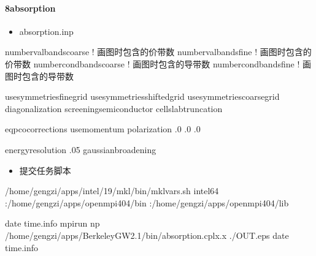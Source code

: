 \documentclass[a4paper,12pt,english]{sphinxmanual}
\begin{document}
\paragraph{8\sphinxhyphen{}absorption}
\label{\detokenize{tutorials/berkeleygw/gw:absorption}}\begin{itemize}
\item {} 
\sphinxAtStartPar
absorption.inp

\end{itemize}

\begin{sphinxVerbatim}[commandchars=\\\{\}]
number\PYGZus{}val\PYGZus{}bands\PYGZus{}coarse   ! 画图时包含的价带数
number\PYGZus{}val\PYGZus{}bands\PYGZus{}fine     ! 画图时包含的价带数
number\PYGZus{}cond\PYGZus{}bands\PYGZus{}coarse  ! 画图时包含的导带数
number\PYGZus{}cond\PYGZus{}bands\PYGZus{}fine    ! 画图时包含的导带数

use\PYGZus{}symmetries\PYGZus{}fine\PYGZus{}grid
use\PYGZus{}symmetries\PYGZus{}shifted\PYGZus{}grid
use\PYGZus{}symmetries\PYGZus{}coarse\PYGZus{}grid
diagonalization
screening\PYGZus{}semiconductor
cell\PYGZus{}slab\PYGZus{}truncation

eqp\PYGZus{}co\PYGZus{}corrections
use\PYGZus{}momentum
polarization .0 .0 .0

energy\PYGZus{}resolution .05
gaussian\PYGZus{}broadening
\end{sphinxVerbatim}
\begin{itemize}
\item {} 
\sphinxAtStartPar
提交任务脚本

\end{itemize}

\begin{sphinxVerbatim}[commandchars=\\\{\}]

 
 /home/gengzi/apps/intel/19/mkl/bin/mklvars.sh intel64
 :/home/gengzi/apps/openmpi404/bin
 :/home/gengzi/apps/openmpi404/lib

date  \PYGZgt{}\PYGZgt{} time.info
mpirun \PYGZhy{}np  /home/gengzi/apps/BerkeleyGW\PYGZhy{}2.1/bin/absorption.cplx.x \PYGZgt{} ./OUT.eps
date  \PYGZgt{}\PYGZgt{} time.info
\end{sphinxVerbatim}
\end{document}
